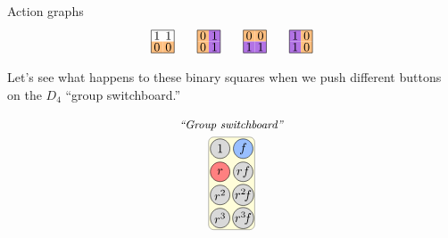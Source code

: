 \documentclass[8pt, handout]{beamer}
\newcommand{\Pause}{}      %
\begin{document}
\begin{frame}{Action graphs}
\[\begin{tikzpicture}[scale=.65]
\begin{scope}[shift={(6,0)}]
      \path[fill=actOrange] (0,0) rectangle ++(.5,.5);
      \path[fill=actOrange] (.5,0) rectangle ++(.5,.5);
      \draw (0,0) rectangle (1,1);
      \draw (.25,.75) node{$1$}; \draw (.75,.75) node{$1$};
      \draw (.25,.25) node{$0$}; \draw (.75,.25) node{$0$};
    \end{scope}
    \begin{scope}[shift={(8,0)}]
      \path[fill=actOrange] (0,.5) rectangle ++(.5,.5); 
      \path[fill=actPurple] (.5,.5) rectangle ++(.5,.5);
      \path[fill=actOrange] (0,0) rectangle ++(.5,.5);
      \path[fill=actPurple] (.5,0) rectangle ++(.5,.5);
      \draw (0,0) rectangle (1,1);
      \draw (.25,.75) node{$0$}; \draw (.75,.75) node{$1$};
      \draw (.25,.25) node{$0$}; \draw (.75,.25) node{$1$};
    \end{scope}
    \begin{scope}[shift={(10,0)}]
      \path[fill=actOrange] (0,.5) rectangle ++(.5,.5); 
      \path[fill=actOrange] (.5,.5) rectangle ++(.5,.5);
      \path[fill=actPurple] (0,0) rectangle ++(.5,.5);
      \path[fill=actPurple] (.5,0) rectangle ++(.5,.5);
      \draw (0,0) rectangle (1,1);
      \draw (.25,.75) node{$0$}; \draw (.75,.75) node{$0$};
        \draw (.25,.25) node{$1$}; \draw (.75,.25) node{$1$};
    \end{scope}
    \begin{scope}[shift={(12,0)}]
      \path[fill=actPurple] (0,.5) rectangle ++(.5,.5); 
      \path[fill=actOrange] (.5,.5) rectangle ++(.5,.5);
      \path[fill=actPurple] (0,0) rectangle ++(.5,.5);
      \path[fill=actOrange] (.5,0) rectangle ++(.5,.5);
      \draw (0,0) rectangle (1,1);
      \draw (.25,.75) node{$1$}; \draw (.75,.75) node{$0$};
      \draw (.25,.25) node{$1$}; \draw (.75,.25) node{$0$};
    \end{scope}
  \end{tikzpicture}
  \]

  \Pause%

  Let's see what happens to these binary squares when we push different buttons on the $D_4$ ``group switchboard.''

  \[
  \begin{tikzpicture}[scale=.65]
      \tikzstyle{v} = [circle, draw, fill=lightgray,inner sep=0pt, 
        minimum size=5.5mm]
      \node at (.5,4) {\small \emph{``Group switchboard''}};
      \draw [midgray,fill=vYellow!50,rounded corners] (-.5,-.5)
      rectangle ++(2,4); 
      \node at (0,3) [v] {$1$}; \node at (1,3) [v,fill=vBlue] {$f$};
      \node at (0,2) [v,fill=vRed] {$r$}; \node at (1,2) [v] {$rf$};
      \node at (0,1) [v] {$r^2$}; \node at (1,1) [v] {$r^2\!f$};
      \node at (0,0) [v] {$r^3$}; \node at (1,0) [v] {$r^3\!f$};
  \end{tikzpicture}
  \]

\end{frame}
\end{document}
